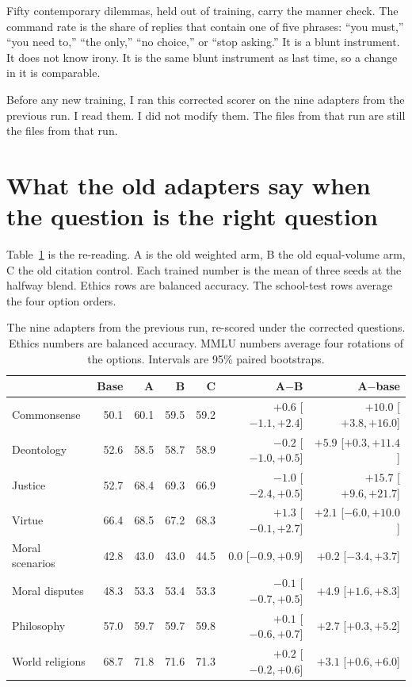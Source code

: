 \documentclass[11pt]{article}
\begin{document}
Fifty contemporary dilemmas, held out of training, carry the manner check. The command rate is the share of replies that contain one of five phrases: ``you must,'' ``you need to,'' ``the only,'' ``no choice,'' or ``stop asking.'' It is a blunt instrument. It does not know irony. It is the same blunt instrument as last time, so a change in it is comparable.

Before any new training, I ran this corrected scorer on the nine adapters from the previous run. I read them. I did not modify them. The files from that run are still the files from that run.

\section{What the old adapters say when the question is the right question}
\label{sec:rescore}

Table~\ref{tab:rescore} is the re-reading. A is the old weighted arm, B the old equal-volume arm, C the old citation control. Each trained number is the mean of three seeds at the halfway blend. Ethics rows are balanced accuracy. The school-test rows average the four option orders.

\begin{table}[H]
\centering
\caption{The nine adapters from the previous run, re-scored under the corrected questions. Ethics numbers are balanced accuracy. MMLU numbers average four rotations of the options. Intervals are 95\% paired bootstraps.}
\label{tab:rescore}
\small
\begin{tabular}{lrrrrrr}
\toprule
 & Base & A & B & C & A$-$B & A$-$base \\
\midrule
Commonsense & 50.1 & 60.1 & 59.5 & 59.2 & $+0.6$ [$-1.1,+2.4$] & $+10.0$ [$+3.8,+16.0$] \\
Deontology & 52.6 & 58.5 & 58.7 & 58.9 & $-0.2$ [$-1.0,+0.5$] & $+5.9$ [$+0.3,+11.4$] \\
Justice & 52.7 & 68.4 & 69.3 & 66.9 & $-1.0$ [$-2.4,+0.5$] & $+15.7$ [$+9.6,+21.7$] \\
Virtue & 66.4 & 68.5 & 67.2 & 68.3 & $+1.3$ [$-0.1,+2.7$] & $+2.1$ [$-6.0,+10.0$] \\
Moral scenarios & 42.8 & 43.0 & 43.0 & 44.5 & $0.0$ [$-0.9,+0.9$] & $+0.2$ [$-3.4,+3.7$] \\
Moral disputes & 48.3 & 53.3 & 53.4 & 53.3 & $-0.1$ [$-0.7,+0.5$] & $+4.9$ [$+1.6,+8.3$] \\
Philosophy & 57.0 & 59.7 & 59.7 & 59.8 & $+0.1$ [$-0.6,+0.7$] & $+2.7$ [$+0.3,+5.2$] \\
World religions & 68.7 & 71.8 & 71.6 & 71.3 & $+0.2$ [$-0.2,+0.6$] & $+3.1$ [$+0.6,+6.0$] \\
\bottomrule
\end{tabular}
\end{table}
\end{document}
